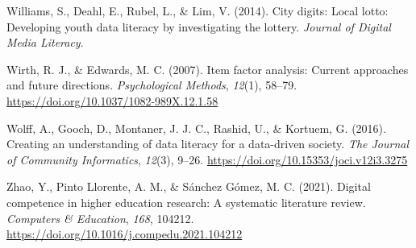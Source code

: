 \documentclass[
  12pt,
  a4paper,
  twoside]{article}
\newlength{\cslhangindent}
\newenvironment{CSLReferences}[2] %
 {\begin{list}{}{%
  \setlength{\itemindent}{0pt}
  \setlength{\leftmargin}{0pt}
  \setlength{\parsep}{0pt}
  \ifodd #1
   \setlength{\leftmargin}{\cslhangindent}
   \setlength{\itemindent}{-1\cslhangindent}
  \fi
  \setlength{\itemsep}{#2\baselineskip}}}
 {\end{list}}
\begin{document}
\begin{CSLReferences}{1}{0}
Williams, S., Deahl, E., Rubel, L., \& Lim, V. (2014). City digits: Local lotto: Developing youth data literacy by investigating the lottery. \emph{Journal of Digital Media Literacy}.

Wirth, R. J., \& Edwards, M. C. (2007). Item factor analysis: Current approaches and future directions. \emph{Psychological Methods}, \emph{12}(1), 58--79. \url{https://doi.org/10.1037/1082-989X.12.1.58}

Wolff, A., Gooch, D., Montaner, J. J. C., Rashid, U., \& Kortuem, G. (2016). Creating an understanding of data literacy for a data-driven society. \emph{The Journal of Community Informatics}, \emph{12}(3), 9--26. \url{https://doi.org/10.15353/joci.v12i3.3275}

Zhao, Y., Pinto Llorente, A. M., \& Sánchez Gómez, M. C. (2021). Digital competence in higher education research: A systematic literature review. \emph{Computers \& Education}, \emph{168}, 104212. \url{https://doi.org/10.1016/j.compedu.2021.104212}

\end{CSLReferences}
\end{document}
